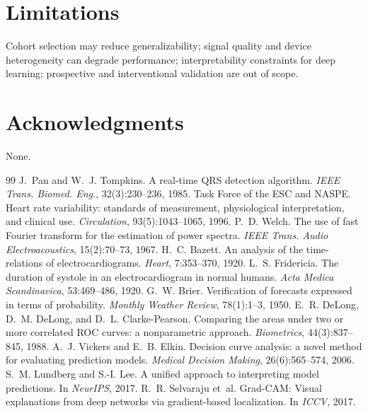 \documentclass[11pt]{article}
\begin{document}
\section{Limitations}
Cohort selection may reduce generalizability; signal quality and device heterogeneity can degrade performance; interpretability constraints for deep learning; prospective and interventional validation are out of scope.

\section*{Acknowledgments}
None.


\begin{thebibliography}{99}
 J.~Pan and W.~J. Tompkins. A real-time QRS detection algorithm. \emph{IEEE Trans. Biomed. Eng.}, 32(3):230--236, 1985.
 Task Force of the ESC and NASPE. Heart rate variability: standards of measurement, physiological interpretation, and clinical use. \emph{Circulation}, 93(5):1043--1065, 1996.
 P.~D. Welch. The use of fast Fourier transform for the estimation of power spectra. \emph{IEEE Trans. Audio Electroacoustics}, 15(2):70--73, 1967.
 H.~C. Bazett. An analysis of the time-relations of electrocardiograms. \emph{Heart}, 7:353--370, 1920.
 L.~S. Fridericia. The duration of systole in an electrocardiogram in normal humans. \emph{Acta Medica Scandinavica}, 53:469--486, 1920.
 G.~W. Brier. Verification of forecasts expressed in terms of probability. \emph{Monthly Weather Review}, 78(1):1--3, 1950.
 E.~R. DeLong, D.~M. DeLong, and D.~L. Clarke-Pearson. Comparing the areas under two or more correlated ROC curves: a nonparametric approach. \emph{Biometrics}, 44(3):837--845, 1988.
 A.~J. Vickers and E.~B. Elkin. Decision curve analysis: a novel method for evaluating prediction models. \emph{Medical Decision Making}, 26(6):565--574, 2006.
 S.~M. Lundberg and S.-I. Lee. A unified approach to interpreting model predictions. In \emph{NeurIPS}, 2017.
 R.~R. Selvaraju et~al. Grad-CAM: Visual explanations from deep networks via gradient-based localization. In \emph{ICCV}, 2017.

\end{thebibliography}
\end{document}
